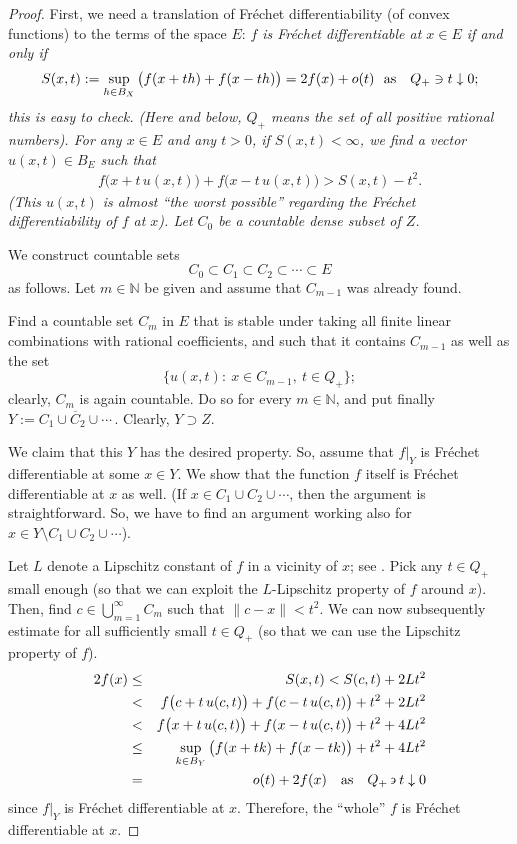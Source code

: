 \documentclass[12pt]{amsart}
\theoremstyle{plain}
\theoremstyle{definition}
\theoremstyle{remark}
\begin{document}
\begin{proof}
First, we need a  translation
of Fr\'echet differentiability (of convex functions)  to the terms of the space $E$:
\sl $f$ is Fr\'echet differentiable at $x\in E$ if and only if
$$
S(x,t):=\sup_{h\in B_X}\big(f(x+th)+f(x-th)\big)=2f(x)+o(t)\ \ {\rm as}\ \ \ Q_+\ni t\downarrow 0;
$$
\rm this is easy to check. (Here and below, $Q_+$ means the set of all positive rational numbers). %
For any $x\in E$ and any $t>0$, if $S(x,t)<\infty$, we find a vector $u(x,t)\in B_E$ such that
\begin{eqnarray}\label{22}
f\big(x+ t\, u(x,t)\big) +f\big(x-t\,u(x,t)\big) > S(x,t)-t^2.
\end{eqnarray}
(This $u(x,t)$ is almost ``the worst possible'' regarding the
Fr\'echet differentiability of $f$ at $x$).
Let $C_0$ be a countable dense subset of $Z$.

We  construct countable sets
$$C_0\subset C_1\subset C_2\subset\cdots\subset E$$ as follows. Let $m\in\mathbb{N}$ be given and assume
that $C_{m-1}$ was already found.

Find a countable set $C_m$ in $E$ that
 is stable under taking all finite linear combinations with rational coefficients, and such that
it contains $C_{m-1}$ as well as the set $$\big\{u(x,t):\ x\in C_{m-1},\ t\in Q_{+}\};$$
clearly, $C_m$ is again countable.
Do so for every $m\in\mathbb{N}$, and put finally $Y:=\overline{C_1\cup C_2\cup\cdots}\,$.
Clearly, $Y\supset Z$.

We claim that this $Y$ has the desired property. So, assume that
$f|_Y$ is Fr\'echet differentiable at some $x\in Y$. We show that the function $f$ itself is
Fr\'echet differentiable at $x$ as well. (If $x\in C_1\cup C_2\cup\cdots$, then the argument is straightforward.
So, we have to find an argument working also for $x\in Y\setminus C_1\cup C_2\cup\cdots$).


Let $L$ denote a Lipschitz constant of $f$ in a vicinity of $x$; see \cite[Proposition 1.6]{p}.
Pick any $t\in Q_+$ small enough (so that we can exploit the $L$-Lipschitz property of $f$ around $x$).
Then, find $c\in\bigcup_{m=1}^\infty C_m$ such that $\|c-x\|<t^2$. We can now
subsequently estimate for all sufficiently small $t\in Q_{+}$ (so that we can use the
Lipschitz property of $f$).
\begin{eqnarray*}
2f(x)&\le& S(x,t) < S(c,t)+ 2Lt^{2}\\
&<& f\big(c+ t\,  u(c,t)\big)+f(c-t\, u(c,t)\big)+t^2 + 2Lt^{2}\\
&<& f\big(x+ t\,  u(c,t)\big)+f(x-t\, u(c,t)\big)+t^2 + 4Lt^{2}\\
&\le&   \sup_{k\in B_Y}\big(f(x+ t  k)+f(x-tk)\big)+t^{2} + 4 Lt^{2}\\
&=&o(t) + 2f(x)\quad {\rm as}\quad Q_{+}\!\backepsilon t\downarrow0
\end{eqnarray*}
since $f|_Y$ is Fr\'echet differentiable at $x$.
Therefore, the ``whole'' $f$ is Fr\'echet differentiable at $x$.
\end{proof}
\end{document}
